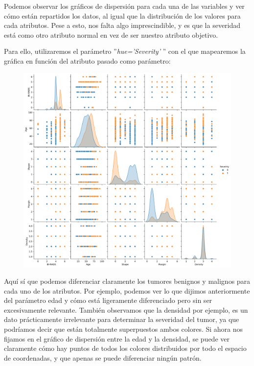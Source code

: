 \documentclass[11pt,a4paper]{article}
\begin{document}
Podemos observar los gráficos de dispersión para cada una de las variables y ver cómo están repartidos los datos, al igual que la
distribución de los valores para cada atributos. Pese a esto, nos falta algo imprescindible, y es que la severidad está como otro
atributo normal en vez de ser nuestro atributo objetivo.

Para ello, utilizaremos el parámetro ''\textit{hue='Severity'} '' con el que mapearemos la gráfica en función del atributo pasado como
parámetro:

\begin{figure}[H]
    \centering
    \includegraphics[scale=0.3]{img/pairplot-hue.png}
\end{figure}

Aquí sí que podemos diferenciar claramente los tumores benignos y malignos para cada uno de los atributos. Por ejemplo, podemos ver
lo que dijimos anteriormente del parámetro edad y cómo está ligeramente diferenciado pero sin ser excesivamente relevante. También
observamos que la densidad por ejemplo, es un dato prácticamente irrelevante para determinar la severidad del tumor, ya que podríamos
decir que están totalmente superpuestos ambos colores. Si ahora nos fijamos en el gráfico de dispersión entre la edad y la densidad,
se puede ver claramente cómo hay puntos de todos los colores distribuidos por todo el espacio de coordenadas, y que apenas se puede
diferenciar ningún patrón.
\end{document}
